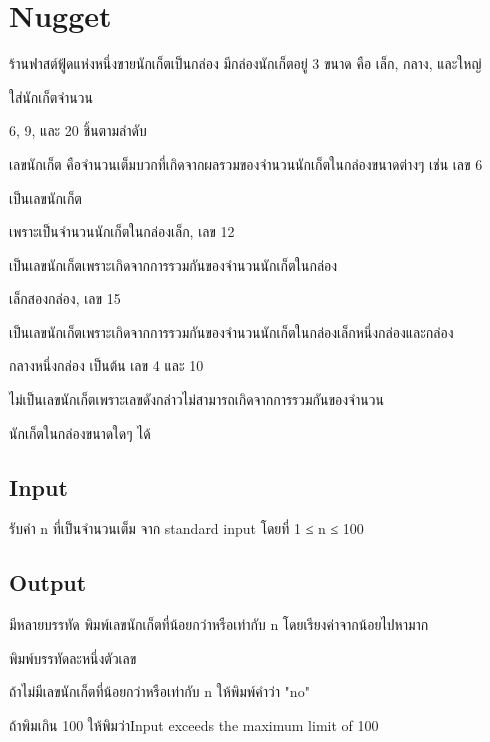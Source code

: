 \documentclass{article}
\begin{document}
\section*{Nugget}

ร้านฟาสต์ฟู้ดแห่งหนึ่งขายนักเก็ตเป็นกล่อง มีกล่องนักเก็ตอยู่ 3 ขนาด คือ เล็ก, กลาง, และใหญ่

ใส่นักเก็ตจำนวน



6, 9, และ 20 ชิ้นตามลำดับ



เลขนักเก็ต คือจำนวนเต็มบวกที่เกิดจากผลรวมของจำนวนนักเก็ตในกล่องขนาดต่างๆ เช่น เลข 6

เป็นเลขนักเก็ต



เพราะเป็นจำนวนนักเก็ตในกล่องเล็ก, เลข 12

เป็นเลขนักเก็ตเพราะเกิดจากการรวมกันของจำนวนนักเก็ตในกล่อง



เล็กสองกล่อง, เลข 15

เป็นเลขนักเก็ตเพราะเกิดจากการรวมกันของจำนวนนักเก็ตในกล่องเล็กหนึ่งกล่องและกล่อง



กลางหนึ่งกล่อง เป็นต้น เลข 4 และ 10

ไม่เป็นเลขนักเก็ตเพราะเลขดังกล่าวไม่สามารถเกิดจากการรวมกันของจำนวน



นักเก็ตในกล่องขนาดใดๆ ได้



\subsection*{Input}
{รับค่า n ที่เป็นจำนวนเต็ม จาก standard input โดยที่ 1 ≤ n ≤ 100}\\



\subsection*{Output}
มีหลายบรรทัด พิมพ์เลขนักเก็ตที่น้อยกว่าหรือเท่ากับ n โดยเรียงค่าจากน้อยไปหามาก

พิมพ์บรรทัดละหนึ่งตัวเลข



ถ้าไม่มีเลขนักเก็ตที่น้อยกว่าหรือเท่ากับ n ให้พิมพ์คำว่า "no"



ถ้าพิมเกิน 100 ให้พิมว่าInput exceeds the maximum limit of 100
\end{document}
